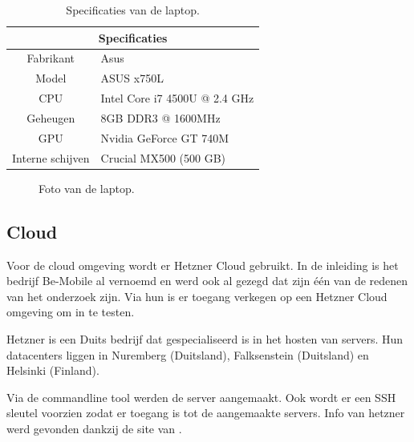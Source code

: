 \begin{table}
    \centering
    \begin{tabular}{c l}
        \hline
        \multicolumn{2}{c}{\textbf{Specificaties}} \\
        \hline
        Fabrikant & Asus \\
        \hline
        Model & ASUS x750L \\
        \hline
        CPU & Intel Core i7 4500U @ 2.4 GHz  \\
        \hline
        Geheugen & 8GB DDR3 @ 1600MHz \\
        \hline
        GPU & Nvidia GeForce GT 740M \\
        \hline
        Interne schijven & Crucial MX500 (500 GB) \\
        \hline
    \end{tabular}
    \caption{Specificaties van de laptop.}
    \label{tab:specs_desktop }
\end{table}

\begin{figure}[!htb]
    \caption{Foto van de laptop.}
    \label{fig:asustest}
\end{figure}


\subsection{Cloud}
Voor de cloud omgeving wordt er Hetzner Cloud gebruikt. In de inleiding is het bedrijf Be-Mobile al vernoemd en werd ook al gezegd dat zijn één van de redenen van het onderzoek zijn. Via hun is er toegang verkegen op een Hetzner Cloud omgeving om in te testen. 

Hetzner is een Duits bedrijf dat gespecialiseerd is in het hosten van servers. Hun datacenters liggen in Nuremberg (Duitsland), Falksenstein (Duitsland) en Helsinki (Finland). 

Via de commandline tool werden de server aangemaakt. Ook wordt er een SSH sleutel voorzien zodat er toegang is tot de aangemaakte servers. Info van hetzner werd gevonden dankzij de site van \autocite{hetzner}.

